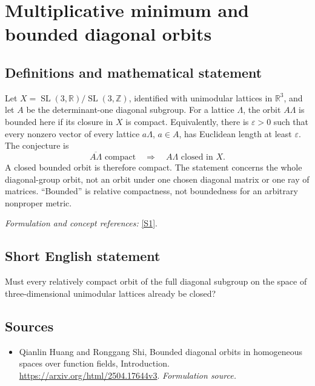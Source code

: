 \documentclass[11pt]{article}
\begin{document}
\section*{\texorpdfstring{Multiplicative minimum and bounded diagonal orbits}{Multiplicative minimum and bounded diagonal orbits}}\label{20003307}
\subsection{Definitions and mathematical statement}
Let $X=\operatorname{SL}(3,{\mathbb{R}})/\operatorname{SL}(3,{\mathbb{Z}})$, identified with unimodular lattices in ${\mathbb{R}}^3$, and let $A$ be the determinant-one diagonal subgroup. For a lattice $\Lambda$, the orbit $A\Lambda$ is bounded here if its closure in $X$ is compact. Equivalently, there is ${\varepsilon}>0$ such that every nonzero vector of every lattice $a\Lambda$, $a\in A$, has Euclidean length at least ${\varepsilon}$. The conjecture is
\[
 \overline{A\Lambda}\text{ compact}\quad\Longrightarrow\quad
 A\Lambda\text{ closed in }X.
\]
A closed bounded orbit is therefore compact. The statement concerns the whole diagonal-group orbit, not an orbit under one chosen diagonal matrix or one ray of matrices. ``Bounded'' is relative compactness, not boundedness for an arbitrary nonproper metric.
\par\smallskip\textit{Formulation and concept references:} \href{https://arxiv.org/html/2504.17644v3}{[S1]}.

\subsection{Short English statement}
Must every relatively compact orbit of the full diagonal subgroup on the space of three-dimensional unimodular lattices already be closed?
\subsection{Sources}
\begin{itemize}
\item[S1]Qianlin Huang and Ronggang Shi, Bounded diagonal orbits in homogeneous spaces over function fields, Introduction.
\url{https://arxiv.org/html/2504.17644v3}.
\textit{Formulation source.}
\end{itemize}
\end{document}
